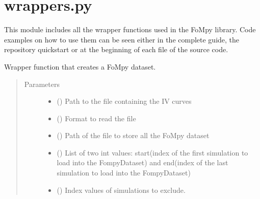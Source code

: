 \documentclass[letterpaper,10pt,english,openany, oneside]{sphinxmanual}
\begin{document}
\section{wrappers.py}
\label{\detokenize{index:wrappers-py}}
This module includes all the wrapper functions used in the FoMpy library.
Code examples on how to use them can be seen either in the complete guide, the repository quickstart
or at the beginning of each file of the source code.

\begin{fulllineitems}
\label{\detokenize{index:fompy.wrappers.dataset}}
Wrapper function that creates a FoMpy dataset.
\begin{quote}\begin{description}
\item[{Parameters}] \leavevmode\begin{itemize}
\item {} 
 () \textendash{} Path to the file containing the IV curves

\item {} 
 () \textendash{} Format to read the file

\item {} 
 () \textendash{} Path of the file to store all the FoMpy dataset

\item {} 
 () \textendash{} List of two int values: start(index of the first simulation to load into the FompyDataset)
and end(index of the last simulation to load into the FompyDataset)

\item {} 
 () \textendash{} Index values of simulations to exclude.


\end{itemize}
\end{description}
\end{quote}
\end{fulllineitems}
\end{document}
